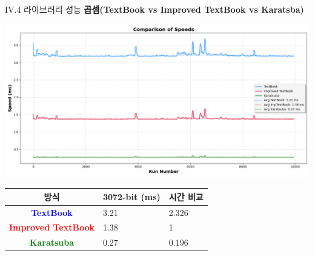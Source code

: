 \documentclass{beamer}
\begin{document}
\begin{frame}{IV.4 라이브러리 성능}
	\alert{\bf 곱셈(TextBook vs Improved TextBook vs Karatsba)}\\
	\begin{center}
		\includegraphics[width=\linewidth,height=.525\textheight]{mul_3072_2.png}
	\end{center}
	\begin{center}
		\begin{tabularx}{\textwidth}{c||XX}
			\hline
			방식 & 3072-bit (ms) & 시간 비교\\
			\midrule
			\textcolor{blue}{\bf TextBook} & 3.21 & 2.326 \\
			\textcolor{red}{\bf Improved TextBook} & 1.38 & 1\\
			\textcolor{green}{\bf Karatsuba} & 0.27 & 0.196\\
			\hline
		\end{tabularx}
	\end{center}
\end{frame}
\end{document}
